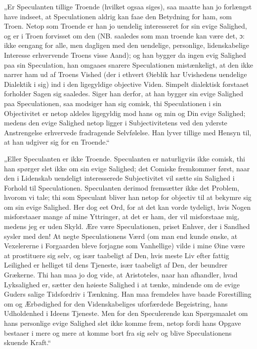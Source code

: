 „Er Speculanten tillige Troende (hvilket ogsaa siges), saa maatte
han jo forlængst have indseet, at Speculationen aldrig kan faae
den Betydning for ham, som Troen. Netop som Troende er han jo
uendelig interesseret for sin evige Salighed, og er i Troen
forvisset om den (NB. saaledes som man troende kan være det, ɔ:
ikke eengang for alle, men dagligen med den uendelige, personlige,
lidenskabelige Interesse erhvervende Troens visse Aand); og han
bygger da ingen evig Salighed paa sin Speculation, han omgaaes
snarere Speculationen mistænkeligt, at den ikke narrer ham ud af
Troens Vished (der i ethvert Øieblik har Uvishedens uendelige
Dialektik i sig) ind i den ligegyldige objective Viden. Simpelt
dialektisk forstaaet forholder Sagen sig
 saaledes. Siger han derfor, at han bygger sin evige Salighed paa
Speculationen, saa modsiger han sig comisk, thi Speculationen i
sin Objectivitet er netop aldeles ligegyldig mod hans og min og
Din evige Salighed; medens den evige Salighed netop ligger i
Subjectivitetens ved den yderste Anstrengelse erhvervede
fradragende Selvfølelse. Han lyver tillige med Hensyn til, at han
udgiver sig for en Troende.“

„Eller Speculanten er ikke Troende. Speculanten er naturligviis
ikke comisk, thi han spørger slet ikke om sin evige Salighed; det
Comiske fremkommer først, naar den i Lidenskab uendeligt
interesserede Subjectivitet vil sætte sin Salighed i Forhold til
Speculationen. Speculanten derimod fremsætter ikke det Problem,
hvorom vi tale; thi som Speculant bliver han netop for objectiv
til at bekymre sig om sin evige Salighed. Her dog eet Ord, for at
det kan vorde tydeligt, hvis Nogen misforstaaer mange af mine
Yttringer, at det er ham, der vil misforstaae mig, medens jeg er
uden Skyld. Ære være Speculationen, priset Enhver, der i Sandhed
sysler med den! At negte Speculationens Værd (om man end kunde
ønske, at Vexelererne i Forgaarden bleve forjagne som Vanhellige)
vilde i mine Øine være at prostituere sig selv, og især taabeligt
af Den, hvis meste Liv efter fattig Leilighed er helliget til dens
Tjeneste, især taabeligt af Den, der beundrer Grækerne. Thi han
maa jo dog vide, at Aristoteles, naar han afhandler, hvad
Lyksalighed er, sætter den høieste Salighed i
 at tænke, mindende om de evige Guders salige Tidsfordriv i
Tænkning. Han maa fremdeles have baade Forestilling om og
Ærbødighed for den Videnskabeliges uforfærdede Begeistring, hans
Udholdenhed i Ideens Tjeneste. Men for den Speculerende kan
Spørgsmaalet om hans personlige evige Salighed slet ikke komme
frem, netop fordi hans Opgave bestaaer i mere og mere at komme
bort fra sig selv og blive Speculationens skuende Kraft.“

